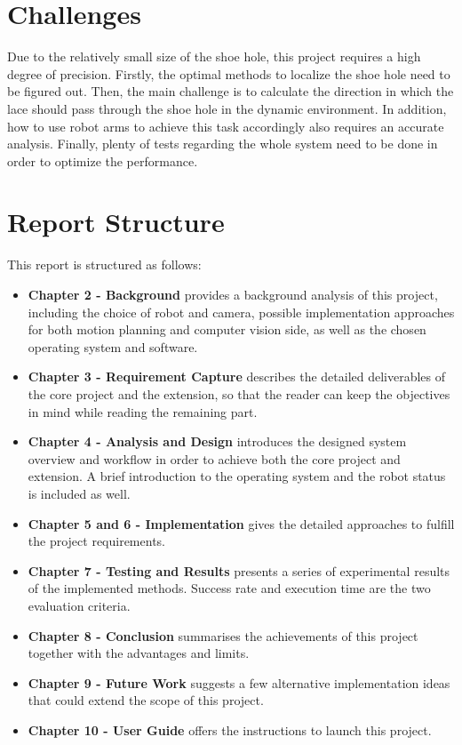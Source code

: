 \section{Challenges}
Due to the relatively small size of the shoe hole, this project requires a high degree of precision. Firstly, the optimal methods to localize the shoe hole need to be figured out. Then, the main challenge is to calculate the direction in which the lace should pass through the shoe hole in the dynamic environment. In addition, how to use robot arms to achieve this task accordingly also requires an accurate analysis. Finally, plenty of tests regarding the whole system need to be done in order to optimize the performance.

\section{Report Structure}
This report is structured as follows:

\begin{itemize}
    \item \textbf{Chapter 2 - Background} provides a background analysis of this project, including the choice of robot and camera, possible implementation approaches for both motion planning and computer vision side, as well as the chosen operating system and software. 
    \item \textbf{Chapter 3 - Requirement Capture} describes the detailed deliverables of the core project and the extension, so that the reader can keep the objectives in mind while reading the remaining part.
    \item \textbf{Chapter 4 - Analysis and Design} introduces the designed system overview and workflow in order to achieve both the core project and extension. A brief introduction to the operating system and the robot status is included as well.
    \item \textbf{Chapter 5 and 6 - Implementation} gives the detailed approaches to fulfill the project requirements.
    \item \textbf{Chapter 7 - Testing and Results} presents a series of experimental results of the implemented methods. Success rate and execution time are the two evaluation criteria.
    \item \textbf{Chapter 8 - Conclusion} summarises the achievements of this project together with the advantages and limits. 
    \item \textbf{Chapter 9 - Future Work} suggests a few alternative implementation ideas that could extend the scope of this project. 
    \item \textbf{Chapter 10 - User Guide} offers the instructions to launch this project.
\end{itemize}
